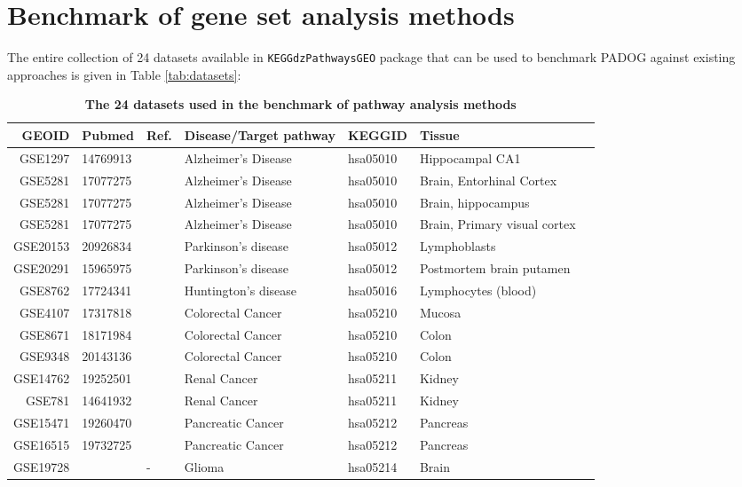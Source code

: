 \documentclass[11pt]{article}
\begin{document}
\section{Benchmark of gene set analysis methods}

The entire collection of 24 datasets available in {\tt KEGGdzPathwaysGEO} package that can be used to benchmark PADOG 
against existing approaches is given in Table \ref{tab:datasets}:

\begin{table}
\caption{\bf{The 24 datasets used in the benchmark of pathway analysis methods}}
\begin{tabular}{rllllll}
  \hline
 GEOID&Pubmed& Ref.& Disease/Target pathway & KEGGID & Tissue \\
  \hline
GSE1297&14769913&\cite{pmid14769913}& Alzheimer's Disease& hsa05010 &Hippocampal CA1\\
GSE5281&17077275&\cite{pmid17077275}& Alzheimer's Disease& hsa05010 &Brain, Entorhinal Cortex\\
GSE5281&17077275&\cite{pmid17077275}& Alzheimer's Disease& hsa05010 &Brain, hippocampus\\
GSE5281&17077275&\cite{pmid17077275}& Alzheimer's Disease& hsa05010 &Brain, Primary visual cortex\\
GSE20153&20926834&\cite{pmid20926834}& Parkinson's disease&hsa05012&Lymphoblasts\\
GSE20291&15965975&\cite{pmid15965975}& Parkinson's disease&hsa05012 &Postmortem brain putamen\\
GSE8762&17724341&\cite{pmid17724341}& Huntington's disease&hsa05016&Lymphocytes (blood) \\
GSE4107&17317818&\cite{pmid17317818}& Colorectal Cancer& hsa05210&Mucosa\\
GSE8671&18171984&\cite{pmid18171984}& Colorectal Cancer& hsa05210&Colon\\
GSE9348&20143136&\cite{pmid20143136}& Colorectal Cancer& hsa05210&Colon\\
GSE14762&19252501 &\cite{pmid19252501}& Renal Cancer& hsa05211&Kidney \\
GSE781&14641932&\cite{pmid14641932}& Renal Cancer& hsa05211&Kidney\\
GSE15471&19260470&\cite{pmid19260470}& Pancreatic Cancer& hsa05212&Pancreas\\
GSE16515&19732725&\cite{pmid19732725}& Pancreatic Cancer& hsa05212&Pancreas\\
GSE19728&&-&Glioma&hsa05214 &Brain\\

\end{tabular}
\end{table}
\end{document}
